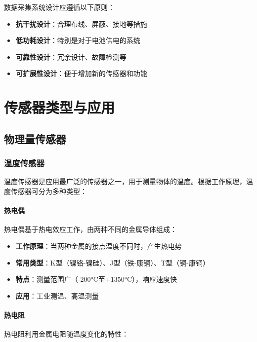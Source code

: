 \documentclass[12pt,UTF8]{ctexbook}
\begin{document}
数据采集系统设计应遵循以下原则：

\begin{itemize}[leftmargin=2cm]
	\item \textbf{抗干扰设计}：合理布线、屏蔽、接地等措施
	\item \textbf{低功耗设计}：特别是对于电池供电的系统
	\item \textbf{可靠性设计}：冗余设计、故障检测等
	\item \textbf{可扩展性设计}：便于增加新的传感器和功能
\end{itemize}

\part{传感器类型与应用}

\chapter{物理量传感器}

\section{温度传感器}

温度传感器是应用最广泛的传感器之一，用于测量物体的温度。根据工作原理，温度传感器可分为多种类型：

\subsection{热电偶}

热电偶基于热电效应工作，由两种不同的金属导体组成：

\begin{itemize}[leftmargin=2cm]
	\item \textbf{工作原理}：当两种金属的接点温度不同时，产生热电势
	\item \textbf{常用类型}：K型（镍铬-镍硅）、J型（铁-康铜）、T型（铜-康铜）
	\item \textbf{特点}：测量范围广（-200°C至+1350°C），响应速度快
	\item \textbf{应用}：工业测温、高温测量
\end{itemize}

\subsection{热电阻}

热电阻利用金属电阻随温度变化的特性：
\end{document}

